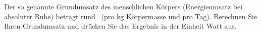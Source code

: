 Der so genannte Grundumsatz des menschlichen Körpers (Energieumsatz bei absoluter Ruhe) beträgt rund \qguO\ (pro kg Körpermasse und pro Tag). Berechnen Sie Ihren Grundumsatz und drücken Sie das Ergebnis in der Einheit Watt aus.
